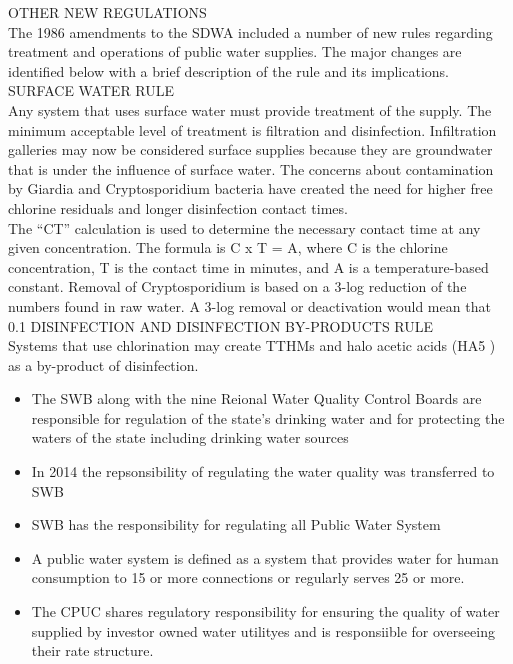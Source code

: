 \documentclass{article}
\begin{document}
OTHER NEW REGULATIONS \\
The 1986 amendments to the SDWA included a number of new rules regarding treatment and operations of public water supplies. The major changes are identified below with a brief description of the rule and its implications. \\
SURFACE WATER RULE \\
Any system that uses surface water must provide treatment of the supply. The minimum acceptable level of treatment is filtration and disinfection. Infiltration galleries may now be considered surface supplies because they are groundwater that is under the influence of surface water. The concerns about contamination by Giardia and Cryptosporidium bacteria have created the need for higher free chlorine residuals and longer disinfection contact times. \\
The “CT” calculation is used to determine the necessary contact time at any given concentration. The formula is C x T = A, where C is the chlorine concentration, T is the contact time in minutes, and A is a temperature-based constant. Removal of Cryptosporidium is based on a 3-log reduction of the numbers found in raw water. A 3-log removal or deactivation would mean that 0.1%
DISINFECTION AND DISINFECTION BY-PRODUCTS RULE \\
Systems that use chlorination may create TTHMs and halo acetic acids (HA5 ) as a by-product of disinfection.   \\

\begin{itemize}
\item The SWB along with the nine Reional Water Quality Control Boards are responsible for regulation of the state's drinking water and for protecting the waters of the state including drinking water sources
\item In 2014 the repsonsibility of regulating the water quality was transferred to SWB
\item SWB has the responsibility for regulating all Public Water System
\item A public water system is defined as a system that provides water for human consumption to 15 or more connections or regularly serves 25 or more.\\

\item The CPUC shares regulatory responsibility for ensuring the quality of water supplied by investor owned water utilityes and is responsiible for overseeing their rate structure. 
\end{itemize}
\end{document}
